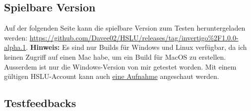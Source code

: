\documentclass{article}
\begin{document}
\subsection{Spielbare Version}

Auf der folgenden Seite kann die spielbare Version zum Testen heruntergeladen werden: \url{https://github.com/Davee02/HSLU/releases/tag/invertigo%2F1.0.0-alpha.1}.
\textbf{Hinweis:} Es sind nur Builds für Windows und Linux verfügbar, da ich keinen Zugriff auf einen Mac habe, um ein Build für MacOS zu erstellen. Ausserdem ist nur die Windows-Version
von mir getestet worden. Mit einem gültigen HSLU-Account kann auch \href{https://hsluzern-my.sharepoint.com/:v:/g/personal/david_hodel_stud_hslu_ch/ERNPkmf1C21Gv_LZLtlVvyMBVqpiyUY922O5hHg5LMQeQw?e=HGsUoI&nav=eyJyZWZlcnJhbEluZm8iOnsicmVmZXJyYWxBcHAiOiJTdHJlYW1XZWJBcHAiLCJyZWZlcnJhbFZpZXciOiJTaGFyZURpYWxvZy1MaW5rIiwicmVmZXJyYWxBcHBQbGF0Zm9ybSI6IldlYiIsInJlZmVycmFsTW9kZSI6InZpZXcifX0%3D}{eine Aufnahme}
angeschaut werden. 

\subsection{Testfeedbacks}
\end{document}

